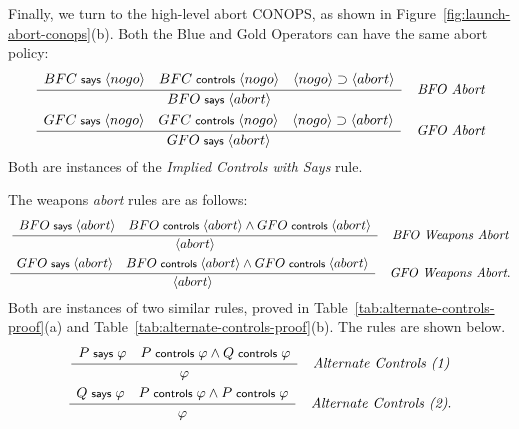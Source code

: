 \documentclass[10pt,twoside]{article}
\newcommand{\action}[1]{\ensuremath{\langle #1 \rangle}}
\renewcommand{\infname}[1]{\textit{#1}}
\renewcommand{\irule}[3]
    {\ensuremath{{\displaystyle \frac{#1}{#2}}\quad \infname{#3}}}
\begin{document}
Finally, we turn to the high-level abort CONOPS, as shown in
Figure~\ref{fig:launch-abort-conops}(b). Both the Blue and Gold
Operators can have the same abort policy:
\begin{gather*}
  \irule
  {
    \begin{array}{c}
      BFC \says \action{nogo} \quad BFC \controls \action{nogo} \quad
      \action{nogo} \implies \action{abort}
    \end{array}
  }
  {BFO \says \action{abort}}
  {BFO Abort}\\
  \irule
  {
    \begin{array}{c}
      GFC \says \action{nogo} \quad GFC \controls \action{nogo} \quad
      \action{nogo} \implies \action{abort}
    \end{array}
  }
  {GFO \says \action{abort}}
  {GFO Abort}
\end{gather*}
Both are instances of the \emph{Implied Controls with Says} rule. 

The weapons \emph{abort} rules are as follows:
\begin{gather*}
  \irule
  {
    \begin{array}{c}
      BFO \says \action{abort} \quad BFO \controls \action{abort} \wedge
      GFO \controls \action{abort}
    \end{array}
  }
  {\action{abort}}
  {BFO Weapons Abort}\\
  \irule
  {
    \begin{array}{c}
      GFO \says \action{abort} \quad BFO \controls \action{abort} \wedge
      GFO \controls \action{abort}
    \end{array}
  }
  {\action{abort}}
  {GFO Weapons Abort}.
\end{gather*}
Both are instances of two similar rules, proved in
Table~\ref{tab:alternate-controls-proof}(a) and
Table~\ref{tab:alternate-controls-proof}(b). The rules are shown
below.
\begin{gather*}
  \irule
  {
    \begin{array}{c}
      P \says \varphi \quad P \controls \varphi \wedge
      Q \controls \varphi
    \end{array}
  }
  {\varphi}
  {Alternate Controls (1)}\\
  \irule
  {
    \begin{array}{c}
      Q \says \varphi \quad P \controls \varphi \wedge
      P \controls \varphi
    \end{array}
  }
  {\varphi}
  {Alternate Controls (2)}.  
\end{gather*}
\end{document}
